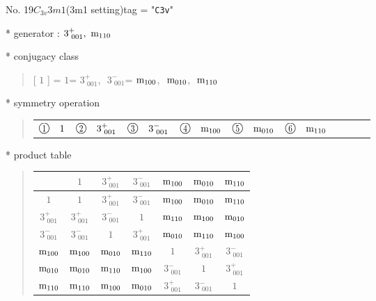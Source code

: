 \documentclass[fleqn,10pt,landscape]{jsarticle}
\begin{document}
\newpage

No. 19\quad$C_{3v}$\quad$3m1$\quad(3m1 setting)\quad[ trigonal ]
tag = "{\tt C3v}"

* generator : $3^{+}_{\,\,001},\,\,{\rm m}_{110}$

* conjugacy class
\begin{quote}
[ $1$ ] = \quad $1$\newline[ $3^{+}_{\,\,001}$ ] = \quad $3^{+}_{\,\,001}$,\,\, $3^{-}_{\,\,001}$\newline[ ${\rm m}_{100}$ ] = \quad ${\rm m}_{100}$,\,\, ${\rm m}_{010}$,\,\, ${\rm m}_{110}$\newline
\end{quote}

* symmetry operation
\begin{quote}
\begin{tabular}{llllllllll}
$ {\ooalign{\hfil\resizebox{.8\width}{\height}{1}\hfil\crcr\raise.1ex\hbox{\large$\bigcirc$}}}\quad 1 $ & $ {\ooalign{\hfil\resizebox{.8\width}{\height}{2}\hfil\crcr\raise.1ex\hbox{\large$\bigcirc$}}}\quad 3^{+}_{\,\,001} $ & $ {\ooalign{\hfil\resizebox{.8\width}{\height}{3}\hfil\crcr\raise.1ex\hbox{\large$\bigcirc$}}}\quad 3^{-}_{\,\,001} $ & $ {\ooalign{\hfil\resizebox{.8\width}{\height}{4}\hfil\crcr\raise.1ex\hbox{\large$\bigcirc$}}}\quad {\rm m}_{100} $ & $ {\ooalign{\hfil\resizebox{.8\width}{\height}{5}\hfil\crcr\raise.1ex\hbox{\large$\bigcirc$}}}\quad {\rm m}_{010} $ & $ {\ooalign{\hfil\resizebox{.8\width}{\height}{6}\hfil\crcr\raise.1ex\hbox{\large$\bigcirc$}}}\quad {\rm m}_{110} $
\end{tabular}
\end{quote}

* product table
\begin{quote}
\begin{tabular}{ccccccc} \hline \hline
 & $ 1 $ & $ 3^{+}_{\,\,001} $ & $ 3^{-}_{\,\,001} $ & $ {\rm m}_{100} $ & $ {\rm m}_{010} $ & $ {\rm m}_{110} $ \\ \hline
$ 1 $ & $ 1 $ & $ 3^{+}_{\,\,001} $ & $ 3^{-}_{\,\,001} $ & $ {\rm m}_{100} $ & $ {\rm m}_{010} $ & $ {\rm m}_{110} $ \\
$ 3^{+}_{\,\,001} $ & $ 3^{+}_{\,\,001} $ & $ 3^{-}_{\,\,001} $ & $ 1 $ & $ {\rm m}_{110} $ & $ {\rm m}_{100} $ & $ {\rm m}_{010} $ \\
$ 3^{-}_{\,\,001} $ & $ 3^{-}_{\,\,001} $ & $ 1 $ & $ 3^{+}_{\,\,001} $ & $ {\rm m}_{010} $ & $ {\rm m}_{110} $ & $ {\rm m}_{100} $ \\
$ {\rm m}_{100} $ & $ {\rm m}_{100} $ & $ {\rm m}_{010} $ & $ {\rm m}_{110} $ & $ 1 $ & $ 3^{+}_{\,\,001} $ & $ 3^{-}_{\,\,001} $ \\
$ {\rm m}_{010} $ & $ {\rm m}_{010} $ & $ {\rm m}_{110} $ & $ {\rm m}_{100} $ & $ 3^{-}_{\,\,001} $ & $ 1 $ & $ 3^{+}_{\,\,001} $ \\
$ {\rm m}_{110} $ & $ {\rm m}_{110} $ & $ {\rm m}_{100} $ & $ {\rm m}_{010} $ & $ 3^{+}_{\,\,001} $ & $ 3^{-}_{\,\,001} $ & $ 1 $ \\
 \hline \hline
\end{tabular}
\end{quote}
\end{document}
